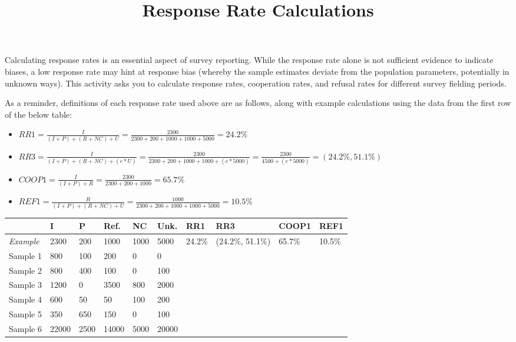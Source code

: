 \documentclass[12pt, a4]{article}
\title{Response Rate Calculations\vspace{-2em}}
\author{}
\date{}
\begin{document}
\maketitle

\noindent Calculating response rates is an essential aspect of survey reporting. While the response rate alone is not sufficient evidence to indicate biases, a low response rate may hint at response bias (whereby the sample estimates deviate from the population parameters, potentially in unknown ways). This activity asks you to calculate response rates, cooperation rates, and refusal rates for different survey fielding periods.

\vspace{1em}
\noindent As a reminder, definitions of each response rate used above are as follows, along with example calculations using the data from the first row of the below table:

{{\large }
	\begin{itemize}
		\item $RR1 = \frac{I}{(I + P) + (R + NC) + U} = \frac{2300}{2300+200 + 1000 + 1000 + 5000} = 24.2\%$
		\item $RR3 = \frac{I}{(I + P) + (R + NC) + (e*U)} = \frac{2300}{2300+200 + 1000 + 1000 + (e*5000)} = \frac{2300}{4500 +(e*5000)} = (24.2\%, 51.1\%)$
		\item $COOP1 = \frac{I}{(I + P) + R} = \frac{2300}{2300+200+1000} = 65.7\%$
		\item $REF1 = \frac{R}{(I + P) + (R + NC) + U} = \frac{1000}{2300+200 + 1000 + 1000 + 5000} = 10.5\%$
	\end{itemize}
}

\begin{center}
\def\arraystretch{3}
\begin{tabular}{| l || p{0.4in}|p{0.4in}|p{0.4in}|p{0.4in}|p{0.4in} || p{0.7in} | p{1.1in} | p{.7in} | p{.7in} ||}
	\hline
& \textbf{I} & \textbf{P} & \textbf{Ref.} & \textbf{NC} & \textbf{Unk.} & \textbf{RR1} & \textbf{RR3} & \textbf{COOP1} & \textbf{REF1} \\ \hline
\textit{Example} & 2300 & 200 & 1000 & 1000 & 5000 & 24.2\%& (24.2\%, 51.1\%) & 65.7\%& 10.5\% \\ \hline
Sample 1 & 800        & 100        & 200           & 0           & 0 &&&&\\ \hline
Sample 2 & 800        & 400        & 100           & 0           & 100 &&&&\\ \hline
Sample 3 & 1200       & 0          & 3500          & 800         & 2000 &&&&\\ \hline
Sample 4 & 600        & 50         & 50            & 100         & 200 &&&&\\ \hline
Sample 5 & 350        & 650        & 150           & 0           & 100 &&&&\\ \hline
Sample 6 & 22000      & 2500       & 14000         & 5000        & 20000 &&&&\\ \hline
\end{tabular}
\end{center}
\end{document}
